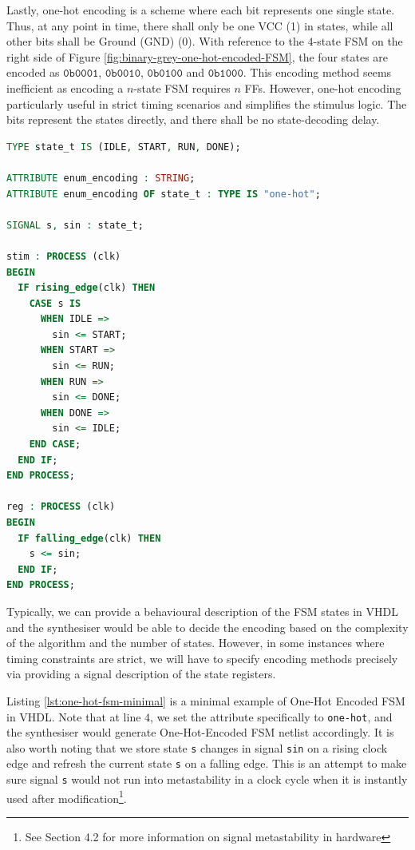 \documentclass[a4paper]{report}
\newcommand{\proglang}{\textsf}
\newcommand{\code}{\texttt}
\begin{document}
Lastly, one-hot encoding is a scheme where each bit represents one single state. Thus, at any point in time, there shall only be one VCC (1) in states, while all other bits shall be Ground (GND) (0). With reference to the $4$-state FSM on the right side of Figure \ref{fig:binary-grey-one-hot-encoded-FSM}, the four states are encoded as $\mathtt{0b0001}$, $\mathtt{0b0010}$,  $\mathtt{0b0100}$ and $\mathtt{0b1000}$. This encoding method seems inefficient as encoding a $n$-state FSM requires $n$ FFs. However, one-hot encoding particularly useful in strict timing scenarios and simplifies the stimulus logic. The bits represent the states directly, and there shall be no state-decoding delay.

\begin{lstlisting}[language=VHDL, caption=One-Hot Encoded FSM Minimal Example in \proglang{VHDL}, label={lst:one-hot-fsm-minimal}]
TYPE state_t IS (IDLE, START, RUN, DONE);

ATTRIBUTE enum_encoding : STRING;
ATTRIBUTE enum_encoding OF state_t : TYPE IS "one-hot";

SIGNAL s, sin : state_t;

stim : PROCESS (clk)
BEGIN
  IF rising_edge(clk) THEN
    CASE s IS
      WHEN IDLE =>
        sin <= START;
      WHEN START =>
        sin <= RUN;
      WHEN RUN =>
        sin <= DONE;
      WHEN DONE =>
        sin <= IDLE;
    END CASE;
  END IF;
END PROCESS;

reg : PROCESS (clk)
BEGIN
  IF falling_edge(clk) THEN
    s <= sin;
  END IF;
END PROCESS;
\end{lstlisting}

Typically, we can provide a behavioural description of the FSM states in \proglang{VHDL} and the synthesiser would be able to decide the encoding based on the complexity of the algorithm and the number of states. However, in some instances where timing constraints are strict, we will have to specify encoding methods precisely via providing a signal description of the state registers.

Listing \ref{lst:one-hot-fsm-minimal} is a minimal example of One-Hot Encoded FSM in \proglang{VHDL}. Note that at line $4$, we set the attribute specifically to \code{one-hot}, and the synthesiser would generate One-Hot-Encoded FSM netlist accordingly. It is also worth noting that we store state \code{s} changes in signal \code{sin} on a rising clock edge and refresh the current state \code{s} on a falling edge. This is an attempt to make sure signal \code{s} would not run into metastability in a clock cycle when it is instantly used after modification\footnote{See Section 4.2 for more information on signal metastability in hardware}.
\end{document}
